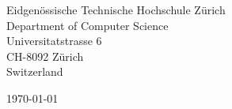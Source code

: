 \begin{minipage}{0.49\textwidth}
\begin{flushleft}
\noindent
Eidgenössische Technische Hochschule Zürich\\
Department of Computer Science \\
Universitatstrasse 6\\
CH-8092 Zürich\\
Switzerland
\end{flushleft}
\end{minipage}
\begin{minipage}{0.47\textwidth}
\begin{flushright}
\today
\end{flushright}
\end{minipage} \\

\newcommand{\univ}{Eidgenössische Technische Hochschule Zürich}
\newcommand{\univshort}{ETH Zurich}
\newcommand{\degree}{Ph.D.}
\newcommand{\dept}{Computer Science}
